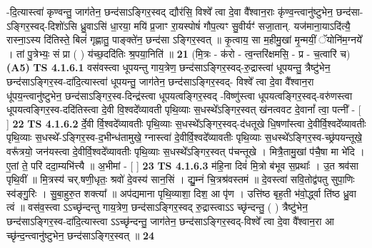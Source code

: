 \documentclass[17pt]{extarticle}
\begin{document}
                  -दि॒त्यास्त्वा॑ कृण्वन्तु॒ जाग॑तेन॒ छन्द॑साऽङ्गिर॒स्वद् द्यौर॑सि॒ विश्वे᳚ त्वा दे॒वा वै᳚श्वान॒राः कृ॑ण्व॒न्त्वानु॑ष्टुभेन॒ छन्द॑सा-ऽङ्गिर॒स्वद्-दिशो॑ऽसि ध्रु॒वाऽसि॑ धा॒रया॒ मयि॑ प्र॒जाꣳ रा॒यस्पोषं॑ गौप॒त्यꣳ सु॒वीर्यꣳ॑ सजा॒तान्. यज॑माना॒याऽदि॑त्यै॒ रास्ना॒ऽस्य दि॑तिस्ते॒ बिलं॑ गृह्णातु॒ पाङ्क्ते॑न॒ छन्द॑सा ऽङ्गिर॒स्वत् ॥ कृ॒त्वाय॒ सा म॒हीमु॒खां मृ॒न्मयीं॒ ॅयोनि॑म॒ग्नये᳚ । तां पु॒त्रेभ्यः॒ सं प्रा ( ) य॑च्छ॒ददि॑तिः श्र॒पया॒निति॑ ॥ \textbf{  21} \newline
                  \newline
                      (मि॒त्रः - क॑रो - त्व॒न्तरि॑क्षमसि॒ - प्र - च॒त्वारि॑ च)  \textbf{(A5)} \newline \newline
                                        \textbf{ TS 4.1.6.1} \newline
                  वस॑वस्त्वा धूपयन्तु गाय॒त्रेण॒ छन्द॑साऽङ्गिर॒स्वद्-रु॒द्रास्त्वा॑ धूपयन्तु॒ त्रैष्टु॑भेन॒ छन्द॑साऽङ्गिर॒स्व-दा॑दि॒त्यास्त्वा॑ धूपयन्तु॒ जाग॑तेन॒ छन्द॑साऽङ्गिर॒स्वद्- विश्वे᳚ त्वा दे॒वा वै᳚श्वान॒रा धू॑पय॒न्त्वानु॑ष्टुभेन॒ छन्द॑साऽङ्गिर॒स्व-दिन्द्र॑स्त्वा धूपयत्वङ्गिर॒स्वद् -विष्णु॑स्त्वा धूपयत्वङ्गिर॒स्वद्-वरु॑णस्त्वा धूपयत्वङ्गिर॒स्व-ददि॑तिस्त्वा दे॒वी वि॒श्वदे᳚व्यावती पृथि॒व्याः स॒धस्थे᳚ऽङ्गिर॒स्वत् ख॑नत्ववट दे॒वानां᳚ त्वा॒ पत्नी᳚ - [  ] \textbf{  22} \newline
                  \newline
                                \textbf{ TS 4.1.6.2} \newline
                  र्दे॒वी र्वि॒श्वदे᳚व्यावतीः पृथि॒व्याः स॒धस्थे᳚ऽङ्गिर॒स्वद्-द॑धतूखे धि॒षणा᳚स्त्वा दे॒वीर्वि॒श्वदे᳚व्यावतीः पृथि॒व्याः स॒धस्थे᳚-ऽङ्गिर॒स्व-द॒भीन्ध॑तामुखे॒ ग्नास्त्वा॑ दे॒वीर्वि॒श्वदे᳚व्यावतीः पृथि॒व्याः स॒धस्थे᳚ऽङ्गिर॒स्व-च्छ्र॑पयन्तूखे॒ वरू᳚त्रयो॒ जन॑यस्त्वा दे॒वीर्वि॒श्वदे᳚व्यावतीः पृथि॒व्याः स॒धस्थे᳚ऽङ्गिर॒स्वत् प॑चन्तूखे । मित्रै॒तामु॒खां प॑चै॒षा मा भे॑दि । ए॒तां ते॒ परि॑ ददा॒म्यभि॑त्त्यै ॥ अ॒भीमां - [  ] \textbf{  23} \newline
                  \newline
                                \textbf{ TS 4.1.6.3} \newline
                  म॑हि॒ना दिवं॑ मि॒त्रो ब॑भूव स॒प्रथाः᳚ । उ॒त श्रव॑सा पृथि॒वीं ॥ मि॒त्रस्य॑ चर्.षणी॒धृतः॒ श्रवो॑ दे॒वस्य॑ सान॒सिं । द्यु॒म्नं चि॒त्रश्र॑वस्तमं ॥ दे॒वस्त्वा॑ सवि॒तोद्व॑पतु सुपा॒णिः स्व॑ङ्गु॒रिः । सु॒बा॒हुरु॒त शक्त्या᳚ ॥ अप॑द्यमाना पृथि॒व्याशा॒ दिश॒ आ पृ॑ण । उत्ति॑ष्ठ बृह॒ती भ॑वो॒र्द्ध्वा ति॑ष्ठ ध्रु॒वा त्वं ॥ वस॑व॒स्त्वा ऽऽच्छृ॑न्दन्तु गाय॒त्रेण॒ छन्द॑साऽङ्गिर॒स्वद् रु॒द्रास्त्वाऽऽ च्छृ॑न्दन्तु॒ ( ) त्रैष्टु॑भेन॒ छन्द॑साऽङ्गिर॒स्व-दा॑दि॒त्यास्त्वा ऽऽच्छृ॑न्दन्तु॒ जाग॑तेन॒ छन्द॑साऽङ्गिर॒स्वद्-विश्वे᳚ त्वा दे॒वा वै᳚श्वान॒रा आ च्छृ॑न्द॒न्त्वानु॑ष्टुभेन॒ छन्द॑साऽङ्गिर॒स्वत् ॥ \textbf{  24} \newline
\end{document}
